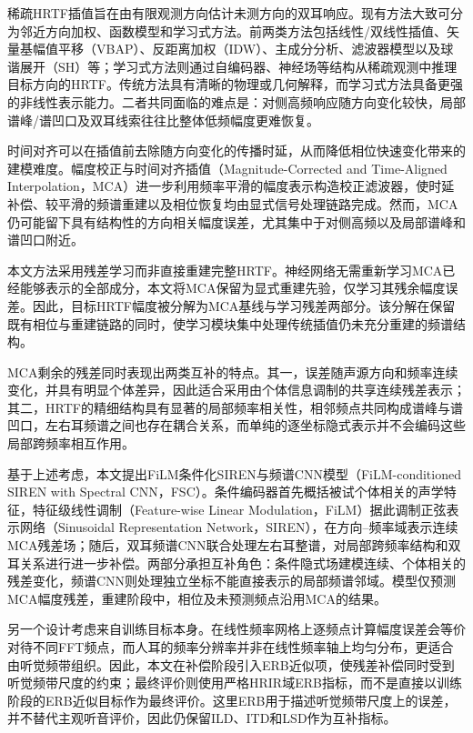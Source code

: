 \documentclass[UTF8,a4paper]{article}
\begin{document}
稀疏HRTF插值旨在由有限观测方向估计未测方向的双耳响应。现有方法大致可分为邻近方向加权、函数模型和学习式方法\cite{R15}。前两类方法包括线性/双线性插值、矢量基幅值平移（VBAP）、反距离加权（IDW）、主成分分析、滤波器模型以及球谐展开（SH）等\cite{R2,R3}；学习式方法则通过自编码器、神经场等结构从稀疏观测中推理目标方向的HRTF\cite{R4,R5}。传统方法具有清晰的物理或几何解释，而学习式方法具备更强的非线性表示能力。二者共同面临的难点是：对侧高频响应随方向变化较快，局部谱峰/谱凹口及双耳线索往往比整体低频幅度更难恢复。

时间对齐可以在插值前去除随方向变化的传播时延，从而降低相位快速变化带来的建模难度\cite{R3}。幅度校正与时间对齐插值（Magnitude-Corrected and Time-Aligned Interpolation，MCA）进一步利用频率平滑的幅度表示构造校正滤波器，使时延补偿、较平滑的频谱重建以及相位恢复均由显式信号处理链路完成\cite{R1}。然而，MCA仍可能留下具有结构性的方向相关幅度误差，尤其集中于对侧高频以及局部谱峰和谱凹口附近。

本文方法采用残差学习而非直接重建完整HRTF。神经网络无需重新学习MCA已经能够表示的全部成分，本文将MCA保留为显式重建先验，仅学习其残余幅度误差。因此，目标HRTF幅度被分解为MCA基线与学习残差两部分。该分解在保留既有相位与重建链路的同时，使学习模块集中处理传统插值仍未充分重建的频谱结构。

MCA剩余的残差同时表现出两类互补的特点。其一，误差随声源方向和频率连续变化，并具有明显个体差异，因此适合采用由个体信息调制的共享连续残差表示；其二，HRTF的精细结构具有显著的局部频率相关性，相邻频点共同构成谱峰与谱凹口，左右耳频谱之间也存在耦合关系，而单纯的逐坐标隐式表示并不会编码这些局部跨频率相互作用。

基于上述考虑，本文提出FiLM条件化SIREN与频谱CNN模型（FiLM-conditioned SIREN with Spectral CNN，FSC）。条件编码器首先概括被试个体相关的声学特征，特征级线性调制（Feature-wise Linear Modulation，FiLM）\cite{R7}据此调制正弦表示网络（Sinusoidal Representation Network，SIREN）\cite{R11}，在方向--频率域表示连续MCA残差场；随后，双耳频谱CNN联合处理左右耳整谱，对局部跨频率结构和双耳关系进行进一步补偿。两部分承担互补角色：条件隐式场建模连续、个体相关的残差变化，频谱CNN则处理独立坐标不能直接表示的局部频谱邻域。模型仅预测MCA幅度残差，重建阶段中，相位及未预测频点沿用MCA的结果。

另一个设计考虑来自训练目标本身。在线性频率网格上逐频点计算幅度误差会等价对待不同FFT频点，而人耳的频率分辨率并非在线性频率轴上均匀分布，更适合由听觉频带组织。因此，本文在补偿阶段引入ERB近似项，使残差补偿同时受到听觉频带尺度的约束；最终评价则使用严格HRIR域ERB指标，而不是直接以训练阶段的ERB近似目标作为最终评价。这里ERB用于描述听觉频带尺度上的误差，并不替代主观听音评价，因此仍保留ILD、ITD和LSD作为互补指标。
\end{document}
